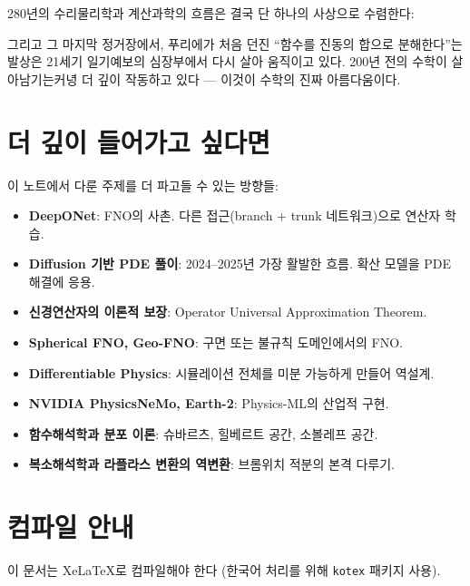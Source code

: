 \documentclass[11pt,a4paper]{article}
\begin{document}
280년의 수리물리학과 계산과학의 흐름은 결국 단 하나의 사상으로 수렴한다:

\begin{center}
\end{center}

그리고 그 마지막 정거장에서, 푸리에가 처음 던진 ``함수를 진동의 합으로 분해한다''는 발상은 21세기 일기예보의 심장부에서 다시 살아 움직이고 있다. 200년 전의 수학이 살아남기는커녕 더 깊이 작동하고 있다 --- 이것이 수학의 진짜 아름다움이다.

\appendix
\section{더 깊이 들어가고 싶다면}

이 노트에서 다룬 주제를 더 파고들 수 있는 방향들:

\begin{itemize}
\item \textbf{DeepONet}: FNO의 사촌. 다른 접근(branch + trunk 네트워크)으로 연산자 학습.
\item \textbf{Diffusion 기반 PDE 풀이}: 2024--2025년 가장 활발한 흐름. 확산 모델을 PDE 해결에 응용.
\item \textbf{신경연산자의 이론적 보장}: Operator Universal Approximation Theorem.
\item \textbf{Spherical FNO, Geo-FNO}: 구면 또는 불규칙 도메인에서의 FNO.
\item \textbf{Differentiable Physics}: 시뮬레이션 전체를 미분 가능하게 만들어 역설계.
\item \textbf{NVIDIA PhysicsNeMo, Earth-2}: Physics-ML의 산업적 구현.
\item \textbf{함수해석학과 분포 이론}: 슈바르츠, 힐베르트 공간, 소볼레프 공간.
\item \textbf{복소해석학과 라플라스 변환의 역변환}: 브롬위치 적분의 본격 다루기.
\end{itemize}

\section{컴파일 안내}

이 문서는 XeLaTeX로 컴파일해야 한다 (한국어 처리를 위해 \texttt{kotex} 패키지 사용).
\end{document}
